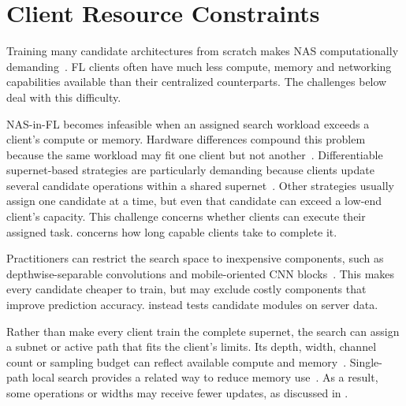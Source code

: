 \section{Client Resource Constraints}

Training many candidate architectures from scratch makes NAS computationally demanding~\cite{nas_1000_papers_2023}. FL clients often have much less compute, memory and networking capabilities available than their centralized counterparts. The challenges below deal with this difficulty.


NAS-in-FL becomes infeasible when an assigned search workload exceeds a client's compute or memory. Hardware differences compound this problem because the same workload may fit one client but not another~\cite{fedoras_2022,fednas_over_hetero_mobile_devices_2022,dfnas_2020,peaches_2024,supernet_trade-off_fednas_2025}. Differentiable supernet-based strategies are particularly demanding because clients update several candidate operations within a shared supernet~\cite{fednas_2021,dp-fnas_2020,feathers_2023,fed_auto_mri_2023}. Other strategies usually assign one candidate at a time, but even that candidate can exceed a low-end client's capacity. This challenge concerns whether clients can execute their assigned task.  concerns how long capable clients take to complete it.

 Practitioners can restrict the search space to inexpensive components, such as depthwise-separable convolutions and mobile-oriented CNN blocks~\cite{fed_auto_mri_2023,intrusion_detection_fednas_2024}. This makes every candidate cheaper to train, but may exclude costly components that improve prediction accuracy.  instead tests candidate modules on server data.

 Rather than make every client train the complete supernet, the search can assign a subnet or active path that fits the client's limits. Its depth, width, channel count or sampling budget can reflect available compute and memory~\cite{fedoras_2022,divide-and-conquer_fednas_2023,peaches_2024,fgfl_2024,supernet_trade-off_fednas_2025,perfedrlnas_2024}. Single-path local search provides a related way to reduce memory use~\cite{dfnas_2020,efnas_2024,load_monitoring_fednas_2025}. As a result, some operations or widths may receive fewer updates, as discussed in .

